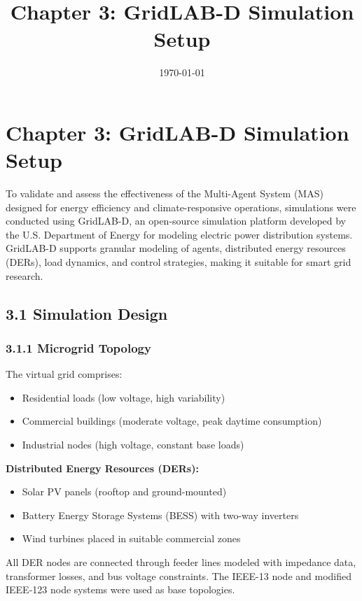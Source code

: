 \documentclass[12pt]{report}
\title{Chapter 3: GridLAB-D Simulation Setup}
\author{}
\date{\today}
\begin{document}
\maketitle

\chapter*{Chapter 3: GridLAB-D Simulation Setup}

To validate and assess the effectiveness of the Multi-Agent System (MAS) designed for energy efficiency and climate-responsive operations, simulations were conducted using GridLAB-D, an open-source simulation platform developed by the U.S. Department of Energy for modeling electric power distribution systems. GridLAB-D supports granular modeling of agents, distributed energy resources (DERs), load dynamics, and control strategies, making it suitable for smart grid research.

\section*{3.1 Simulation Design}

\subsection*{3.1.1 Microgrid Topology}
The virtual grid comprises:
\begin{itemize}
    \item Residential loads (low voltage, high variability)
    \item Commercial buildings (moderate voltage, peak daytime consumption)
    \item Industrial nodes (high voltage, constant base loads)
\end{itemize}

\textbf{Distributed Energy Resources (DERs):}
\begin{itemize}
    \item Solar PV panels (rooftop and ground-mounted)
    \item Battery Energy Storage Systems (BESS) with two-way inverters
    \item Wind turbines placed in suitable commercial zones
\end{itemize}

All DER nodes are connected through feeder lines modeled with impedance data, transformer losses, and bus voltage constraints. The IEEE-13 node and modified IEEE-123 node systems were used as base topologies.
\end{document}
